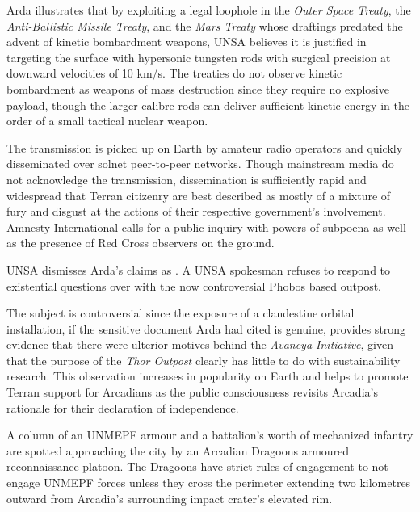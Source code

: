 Arda illustrates that by exploiting a legal loophole in the {\it Outer Space Treaty}, the {\it Anti-Ballistic Missile Treaty}, and the {\it Mars Treaty} whose draftings predated the advent of kinetic bombardment weapons, UNSA believes it is justified in targeting the surface with hypersonic tungsten rods with surgical precision at downward velocities of 10 km/s. The treaties do not observe kinetic bombardment as weapons of mass destruction since they require no explosive payload, though the larger calibre rods can deliver sufficient kinetic energy in the order of a small tactical nuclear weapon.

The transmission is picked up on Earth by amateur radio operators and quickly disseminated over solnet peer-to-peer networks. Though mainstream media do not acknowledge the transmission, dissemination is sufficiently rapid and widespread that Terran citizenry are best described as mostly of a mixture of fury and disgust at the actions of their respective government's involvement. Amnesty International calls for a public inquiry with powers of subpoena as well as the presence of Red Cross observers on the ground.

UNSA dismisses Arda's claims as . A UNSA spokesman refuses to respond to existential questions over with the now controversial Phobos based outpost. 

The subject is controversial since the exposure of a clandestine orbital installation, if the sensitive document Arda had cited is genuine, provides strong evidence that there were ulterior motives behind the {\it Avaneya Initiative}, given that the purpose of the {\it Thor Outpost} clearly has little to do with sustainability research. This observation increases in popularity on Earth and helps to promote Terran support for Arcadians as the public consciousness revisits Arcadia's rationale for their declaration of independence.
\StopTimelineDate

A column of an UNMEPF armour and a battalion's worth of mechanized infantry are spotted approaching the city by an Arcadian Dragoons armoured reconnaissance platoon. The Dragoons have strict rules of engagement to not engage UNMEPF forces unless they cross the perimeter extending two kilometres outward from Arcadia's surrounding impact crater's elevated rim.

